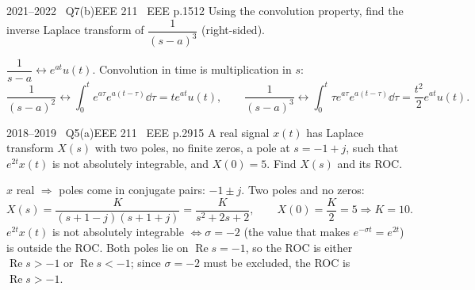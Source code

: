 \begin{qcard}{2021--2022 \textbullet\ Q7(b)}{EEE 211 \textbullet\ EEE p.15}{12}
Using the convolution property, find the inverse Laplace transform of $\dfrac1{(s-a)^3}$ (right-sided).
\end{qcard}
\begin{solution}
$\dfrac1{s-a}\leftrightarrow e^{at}u(t)$. Convolution in time is multiplication in $s$:
\[\frac1{(s-a)^2}\leftrightarrow\int_0^te^{a\tau}e^{a(t-\tau)}\dd\tau=te^{at}u(t),\qquad
\frac1{(s-a)^3}\leftrightarrow\int_0^t\tau e^{a\tau}e^{a(t-\tau)}\dd\tau=\frac{t^2}2e^{at}u(t).\]
\end{solution}

\begin{qcard}{2018--2019 \textbullet\ Q5(a)}{EEE 211 \textbullet\ EEE p.29}{15}
A real signal $x(t)$ has Laplace transform $X(s)$ with two poles, no finite zeros, a pole at $s=-1+j$, such that $e^{2t}x(t)$ is not absolutely integrable, and $X(0)=5$. Find $X(s)$ and its ROC.
\end{qcard}
\begin{solution}
$x$ real $\Rightarrow$ poles come in conjugate pairs: $-1\pm j$. Two poles and no zeros:
\[X(s)=\frac K{(s+1-j)(s+1+j)}=\frac K{s^2+2s+2},\qquad X(0)=\frac K2=5\Rightarrow K=10 .\]
$e^{2t}x(t)$ is not absolutely integrable $\Leftrightarrow\sigma=-2$ (the value that makes $e^{-\sigma t}=e^{2t}$) is outside the ROC. Both poles lie on $\operatorname{Re}s=-1$, so the ROC is either $\operatorname{Re}s>-1$ or $\operatorname{Re}s<-1$; since $\sigma=-2$ must be excluded, the ROC is $\operatorname{Re}s>-1$.
\end{solution}

